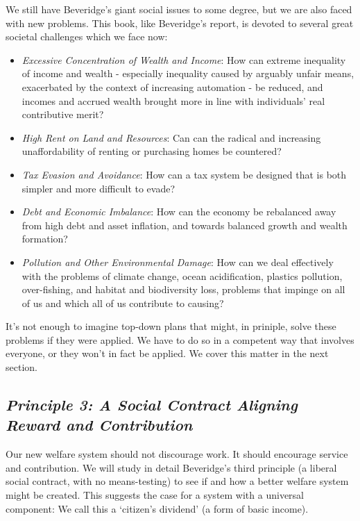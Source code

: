 \documentclass[]{tufte-handout}
\providecommand{\tightlist}{%
  \setlength{\itemsep}{0pt}\setlength{\parskip}{0pt}}
\begin{document}
We still have Beveridge's giant social issues to some degree, but we are
also faced with new problems. This book, like Beveridge's report, is
devoted to several great societal challenges which we face now:

\begin{itemize}
\tightlist
\item
  \emph{Excessive Concentration of Wealth and Income}: How can extreme
  inequality of income and wealth - especially inequality caused by
  arguably unfair means, exacerbated by the context of increasing
  automation - be reduced, and incomes and accrued wealth brought more
  in line with individuals' real contributive merit?
\item
  \emph{High Rent on Land and Resources}: Can can the radical and
  increasing unaffordability of renting or purchasing homes be
  countered?
\item
  \emph{Tax Evasion and Avoidance}: How can a tax system be designed
  that is both simpler and more difficult to evade?
\item
  \emph{Debt and Economic Imbalance}: How can the economy be rebalanced
  away from high debt and asset inflation, and towards balanced growth
  and wealth formation?
\item
  \emph{Pollution and Other Environmental Damage}: How can we deal
  effectively with the problems of climate change, ocean acidification,
  plastics pollution, over-fishing, and habitat and biodiversity loss,
  problems that impinge on all of us and which all of us contribute to
  causing?
\end{itemize}

It's not enough to imagine top-down plans that might, in priniple, solve
these problems if they were applied. We have to do so in a competent way
that involves everyone, or they won't in fact be applied. We cover this
matter in the next section.

\hypertarget{principle-3-a-social-contract-aligning-reward-and-contribution}{%
\subsection{\texorpdfstring{\emph{Principle 3: A Social Contract
Aligning Reward and
Contribution}}{Principle 3: A Social Contract Aligning Reward and Contribution}}\label{principle-3-a-social-contract-aligning-reward-and-contribution}}

Our new welfare system should not discourage work. It should encourage
service and contribution. We will study in detail Beveridge's third
principle (a liberal social contract, with no means-testing) to see if
and how a better welfare system might be created. This suggests the case
for a system with a universal component: We call this a `citizen's
dividend' (a form of basic income).
\end{document}
